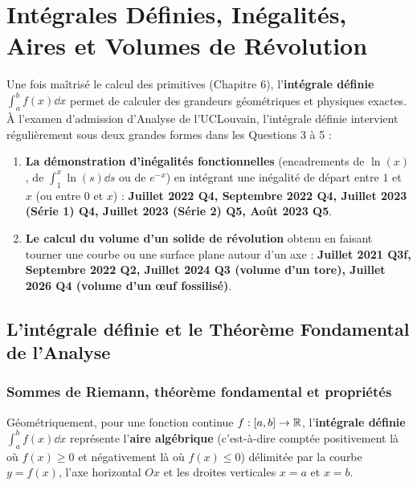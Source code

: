 \chapter{Intégrales Définies, Inégalités, Aires et Volumes de Révolution}

Une fois maîtrisé le calcul des primitives (Chapitre 6), l'\textbf{intégrale définie} $\int_a^b f(x)\dd x$ permet de calculer des grandeurs géométriques et physiques exactes. À l'examen d'admission d'Analyse de l'UCLouvain, l'intégrale définie intervient régulièrement sous deux grandes formes dans les Questions 3 à 5 :
\begin{enumerate}
    \item \textbf{La démonstration d'inégalités fonctionnelles} (encadrements de $\ln(x)$, de $\int_1^x \ln(s)\dd s$ ou de $e^{-x}$) en intégrant une inégalité de départ entre $1$ et $x$ (ou entre $0$ et $x$) : \textbf{Juillet 2022 Q4, Septembre 2022 Q4, Juillet 2023 (Série 1) Q4, Juillet 2023 (Série 2) Q5, Août 2023 Q5}.
    \item \textbf{Le calcul du volume d'un solide de révolution} obtenu en faisant tourner une courbe ou une surface plane autour d'un axe : \textbf{Juillet 2021 Q3f, Septembre 2022 Q2, Juillet 2024 Q3 (volume d'un tore), Juillet 2026 Q4 (volume d'un œuf fossilisé)}.
\end{enumerate}

\section{L'intégrale définie et le Théorème Fondamental de l'Analyse}

\subsection{Sommes de Riemann, théorème fondamental et propriétés}

Géométriquement, pour une fonction continue $f : [a, b] \to \mathbb{R}$, l'\textbf{intégrale définie} $\int_a^b f(x)\dd x$ représente l'\textbf{aire algébrique} (c'est-à-dire comptée positivement là où $f(x) \ge 0$ et négativement là où $f(x) \le 0$) délimitée par la courbe $y = f(x)$, l'axe horizontal $Ox$ et les droites verticales $x = a$ et $x = b$.

